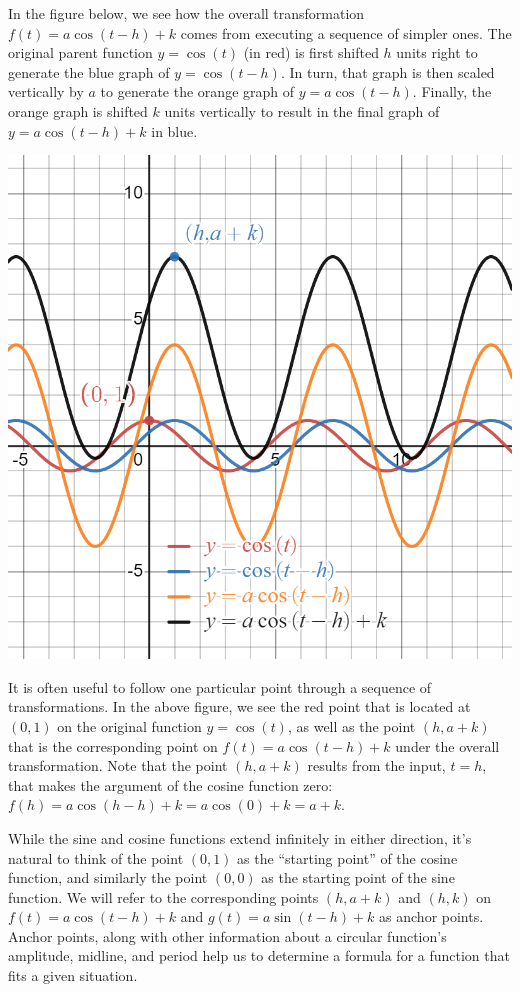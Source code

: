 \documentclass{ximera}
\begin{document}
In the figure below, we see how the overall transformation \(f(t) = a\cos(t-h)+k\) comes from executing a sequence of simpler ones.  The original parent function \(y = \cos(t)\) (in red) is first shifted \(h\) units right to generate the blue graph of \(y = \cos(t - h)\).  In turn, that graph is then scaled vertically by \(a\) to generate the orange graph of \(y = a\cos(t-h)\).  Finally, the orange graph is shifted \(k\) units vertically to result in the final graph of \(y = a\cos(t-h) + k\) in blue.%
\begin{image}
\includegraphics[width=0.8\linewidth]{images/sinusoidal-transformed-cosine-2.png}
\end{image}
It is often useful to follow one particular point through a sequence of transformations.  In the above figure, we see the red point that is located at \((0,1)\) on the original function \(y = \cos(t)\), as well as the point \((h, a+k)\) that is the corresponding point on \(f(t) = a\cos(t-h) + k\) under the overall transformation.  Note that the point \((h,a+k)\) results from the input, \(t = h\), that makes the argument of the cosine function zero:  \(f(h) = a\cos(h - h) + k = a\cos(0) + k = a + k\).%

While the sine and cosine functions extend infinitely in either direction, it's natural to think of the point \((0,1)\) as the ``starting point'' of the cosine function, and similarly the point \((0,0)\) as the starting point of the sine function.  We will refer to the corresponding points \((h,a+k)\) and \((h,k)\) on \(f(t) = a\cos(t-h) + k\) and \(g(t) = a\sin(t-h) + k\) as anchor points. Anchor points, along with other information about a circular function's amplitude, midline, and period help us to determine a formula for a function that fits a given situation.%
\end{document}

